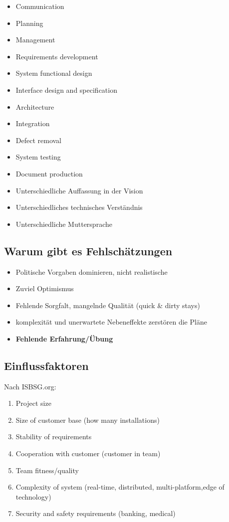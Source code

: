 \begin{multicols}{2}
\begin{itemize}
	\item Communication 
	\item Planning
	\item Management
	\item Requirements development
	\item System functional design
	\item Interface design and specification
	\item Architecture
	\item Integration
	\item Defect removal
	\item System testing
	\item Document production
	\item Unterschiedliche Auffassung in der Vision
	\item Unterschiedliches technisches Verständnis
	\item Unterschiedliche Muttersprache
\end{itemize}
\end{multicols}



\subsection{Warum gibt es Fehlschätzungen}

\begin{itemize}
	\item Politische Vorgaben dominieren, nicht realistische
	\item Zuviel Optimismus
	\item Fehlende Sorgfalt, mangelnde Qualität (quick \& dirty stays)
	\item komplexität und unerwartete Nebeneffekte zerstören die Pläne
	\item \textbf{Fehlende Erfahrung/Übung}
\end{itemize}

\subsection{Einflussfaktoren}

Nach ISBSG.org:

\begin{enumerate}
	\item Project size
	\item Size of customer base (how many installations)
	\item Stability of requirements
	\item Cooperation with customer (customer in team)
	\item Team fitness/quality
	\item Complexity of system (real-time, distributed, multi-platform,edge of technology)
	\item Security and safety requirements (banking, medical)
\end{enumerate}

